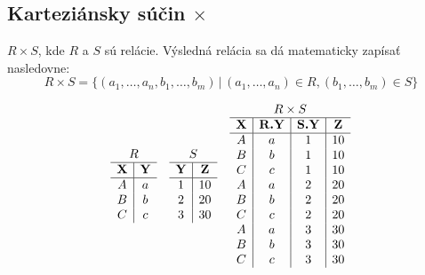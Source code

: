\subsection*{\textbf{Karteziánsky súčin $\times$}} $R \times S$, kde $R$ a $S$ sú relácie.
Výsledná relácia sa dá matematicky zapísať nasledovne: 
$$R \times S = \{(a_1, \dots, a_n, b_1, \dots, b_m) \, | \,  (a_1, \dots, a_n) \in R, (b_1, \dots,
b_m) \in S\}$$
    \begin{priklad}
    \begin{center}
        \[
        \begin{array}{c c c}
            \begin{array}{c|c}
            \multicolumn{2}{c}{R} \\ \hline
            \textbf{X} & \textbf{Y} \\ \hline
            A & a\\
            B & b \\
            C & c
            \end{array}
            &
            \begin{array}{c|c}
            \multicolumn{2}{c}{S} \\ \hline
            \textbf{Y} & \textbf{Z} \\ \hline
            1 & 10\\
            2 & 20\\
            3 & 30
            \end{array}
            &
            \begin{array}{c|c|c|c}
            \multicolumn{4}{c}{R\times S} \\ \hline
            \textbf{X} & \textbf{R.Y} & \textbf{S.Y} & \textbf{Z} \\ \hline
            A & a & 1 & 10\\
            B & b & 1 & 10\\
            C & c & 1 & 10\\
            A & a & 2 & 20\\
            B & b & 2 & 20\\
            C & c & 2 & 20\\
            A & a & 3 & 30\\
            B & b & 3 & 30\\
            C & c & 3 & 30
            \end{array}
        \end{array}
        \]
    \end{center}
    \end{priklad}
    
